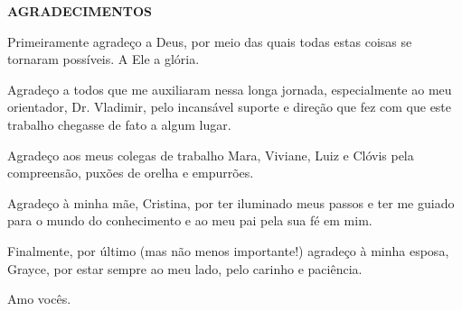 \documentclass[a4paper,11pt]{article}
\begin{document}

\newpage
\begin{center}
\uppercase{\textbf{Agradecimentos}}
\end{center}

\noindent	Primeiramente agradeço a Deus, por meio das quais todas estas coisas se tornaram possíveis. A Ele a glória.

\noindent Agradeço a todos que me auxiliaram nessa longa jornada, especialmente ao meu orientador, Dr. Vladimir, pelo incansável suporte e direção que fez com que este trabalho chegasse de fato a algum lugar.

\noindent Agradeço aos meus colegas de trabalho Mara, Viviane, Luiz e Clóvis pela compreensão, puxões de orelha e empurrões.

\noindent Agradeço à minha mãe, Cristina, por ter iluminado meus passos e ter me guiado para o mundo do conhecimento e ao meu pai pela sua fé em mim.

\noindent Finalmente, por último (mas não menos importante!) agradeço à minha esposa, Grayce, por estar sempre ao meu lado, pelo carinho e paciência.

\begin{center}
  Amo vocês.
\end{center}

\vspace{1cm}
\end{document}
